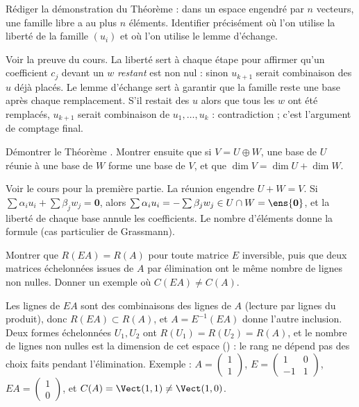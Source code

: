 \begin{exo}
Rédiger la démonstration du Théorème  : dans un espace engendré par $n$ vecteurs, une famille libre a au plus $n$ éléments. Identifier précisément où l'on utilise la liberté de la famille $(u_i)$ et où l'on utilise le lemme d'échange.
\begin{corrige}
Voir la preuve du cours. La liberté sert à chaque étape pour affirmer qu'un coefficient $c_j$ devant un $w$ \emph{restant} est non nul : sinon $u_{k+1}$ serait combinaison des $u$ déjà placés. Le lemme d'échange sert à garantir que la famille reste une base après chaque remplacement. S'il restait des $u$ alors que tous les $w$ ont été remplacés, $u_{k+1}$ serait combinaison de $u_1,\dots,u_k$ : contradiction ; c'est l'argument de comptage final.
\end{corrige}
\end{exo}
\begin{exo}
Démontrer le Théorème . Montrer ensuite que si $V=U\oplus W$, une base de $U$ réunie à une base de $W$ forme une base de $V$, et que $\dim V=\dim U+\dim W$.
\begin{corrige}
Voir le cours pour la première partie. La réunion engendre $U+W=V$. Si $\sum\alpha_iu_i+\sum\beta_jw_j=\mathbf 0$, alors $\sum\alpha_iu_i=-\sum\beta_jw_j\in U\cap W=\ens{\mathbf 0}$, et la liberté de chaque base annule les coefficients. Le nombre d'éléments donne la formule (cas particulier de Grassmann).
\end{corrige}
\end{exo}
\begin{exo}
Montrer que $R(EA)=R(A)$ pour toute matrice $E$ inversible, puis que deux matrices échelonnées issues de $A$ par élimination ont le même nombre de lignes non nulles. Donner un exemple où $C(EA)\neq C(A)$.
\begin{corrige}
Les lignes de $EA$ sont des combinaisons des lignes de $A$ (lecture par lignes du produit), donc $R(EA)\subset R(A)$, et $A=E^{-1}(EA)$ donne l'autre inclusion. Deux formes échelonnées $U_1,U_2$ ont $R(U_1)=R(U_2)=R(A)$, et le nombre de lignes non nulles est la dimension de cet espace () : le rang ne dépend pas des choix faits pendant l'élimination. Exemple : $A=\begin{pmatrix}1\\1\end{pmatrix}$, $E=\begin{pmatrix}1&0\\-1&1\end{pmatrix}$, $EA=\begin{pmatrix}1\\0\end{pmatrix}$, et $C(A)=\Vect(1,1)\neq\Vect(1,0)$.
\end{corrige}
\end{exo}
